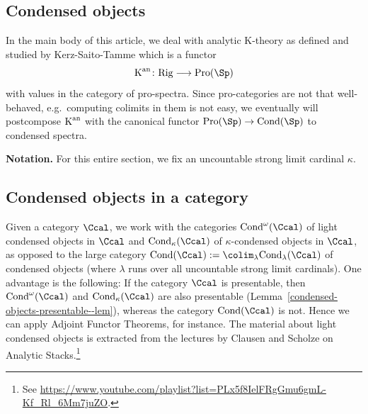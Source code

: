 \documentclass[colorinlistoftodos,article,11pt,reqno]{article}
\newcommand{\Rig}{\textup{Rig}}
\newcommand{\Pro}{\textup{Pro}}
\newcommand{\Cond}{\textup{Cond}}
\newcommand{\K}{\textup{K}}
\newcommand{\Kan}{\K^\textup{an}}
\renewcommand{\to}[1][]{\overset{#1}{\rightarrow}}
\newcommand{\To}[1][]{\overset{#1}{\longrightarrow}}
\begin{document}
\begin{appendix}

\section{Condensed objects}

In the main body of this article, we deal with analytic K-theory as defined and studied by Kerz-Saito-Tamme \cite{kst-i,kst-ii} which is a functor
\[ \Kan \colon \Rig \To \Pro(\Sp) \]
with values in the category of pro-spectra. Since pro-categories are not that well-behaved, e.g.\ computing colimits in them is not easy, we eventually will postcompose $\Kan$ with the canonical functor $\Pro(\Sp)\to\Cond(\Sp)$ to condensed spectra.

\vspace{6pt}\noindent\textbf{Notation.} For this entire section, we fix an uncountable strong limit cardinal $\kappa$.





\subsection{Condensed objects in a category}

Given a category $\Ccal$, we work with the categories $\Cond^\omega(\Ccal)$ of light condensed objects in $\Ccal$ and $\Cond_\kappa(\Ccal)$ of $\kappa$-condensed objects in $\Ccal$, as opposed to the large category $\Cond(\Ccal) := \colim_\lambda\Cond_\lambda(\Ccal)$ of condensed objects (where $\lambda$ runs over all uncountable strong limit cardinals). One advantage is the following: If the category $\Ccal$ is presentable, then $\Cond^\omega(\Ccal)$ and $\Cond_\kappa(\Ccal)$ are also presentable (Lemma~\ref{condensed-objects-presentable--lem}), whereas the category $\Cond(\Ccal)$ is not. Hence we can apply Adjoint Functor Theorems, for instance. The material about light condensed objects is extracted from the lectures by Clausen and Scholze on Analytic Stacks.\footnote{See \url{https://www.youtube.com/playlist?list=PLx5f8IelFRgGmu6gmL-Kf_Rl_6Mm7juZO}.}


\end{appendix}
\end{document}
